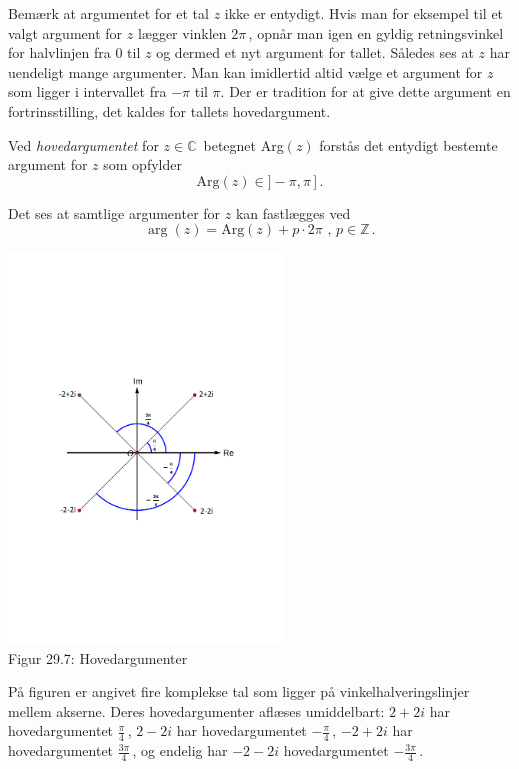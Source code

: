 Bemærk at argumentet for et tal $z$ ikke er entydigt. Hvis man for eksempel til et valgt\- argument for $z$ lægger vinklen $2\pi\,$, opnår man igen en gyldig retningsvinkel for halvlinjen fra $0$ til $z$ og dermed et nyt argument for tallet. Således ses at $z$ har uendeligt mange argumenter.\bs
Man kan imidlertid altid vælge et argument for $z$ som ligger i intervallet fra $-\pi$ til $\pi$. Der er tradition for at give dette argument en fortrinsstilling, det kaldes for tallets ho\-vedargument.\bs
\begin{definition}[Hovedargument]
Ved \textit{hovedargumentet} for $z\in \mathbb C\,$ betegnet Arg$(z)$ forstås det entydigt bestemte argument for $z$ som opfylder
$$\mathrm{Arg}(z)\in\mathrm{]}-\pi,\pi\,\mathrm{]}\,.$$
\end{definition}
Det ses at samtlige argumenter for $z$ kan fastlægges ved 
\begin{equation}
\arg(z)=\mathrm{Arg}(z)+p\cdot 2\pi\,\,,\,p\in \mathbb Z\,.
\end{equation}
\begin{example}[Hovedargumenter]

\begin{center}
	\includegraphics[trim=3cm 8.5cm 3cm 9.5cm,width=0.55\textwidth,clip]{Geometer/retningsvinkel2.pdf}\\
Figur 29.7: Hovedargumenter
\end{center}
På figuren er angivet fire komplekse tal som ligger på vinkelhalveringslinjer mellem akserne. Deres hovedargumenter aflæses umiddelbart: $2+2i$ har hovedargumentet $\frac {\pi}4\,$, $2-2i$ har hovedargumentet $-\frac {\pi}4\,$, $-2+2i$ har hovedargumentet $\frac {3\pi}4\,$, og endelig har $-2-2i$ ho\-ved\-argumentet $-\frac {3\pi}4\,$.
\end{example}

